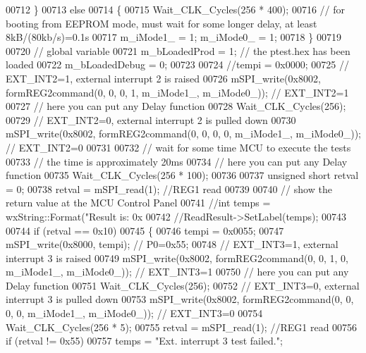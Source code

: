 \begin{DoxyCode}
{{{{00712     \}
00713     \textcolor{keywordflow}{else}
00714     \{
00715         Wait\_CLK\_Cycles(256 * 400);
00716         \textcolor{comment}{// for booting from EEPROM mode, must wait for some longer delay, at least 8kB/(80kb/s)=0.1s}
00717         m\_iMode1\_ = 1; m\_iMode0\_ = 1;
00718     \}
00719 
00720     \textcolor{comment}{// global variable}
00721     m\_bLoadedProd = 1;  \textcolor{comment}{// the ptest.hex has been loaded}
00722     m\_bLoadedDebug = 0;
00723 
00724     \textcolor{comment}{//tempi = 0x0000;}
00725     \textcolor{comment}{// EXT\_INT2=1, external interrupt 2 is raised}
00726     mSPI\_write(0x8002, formREG2command(0, 0, 0, 1, m\_iMode1\_, m\_iMode0\_)); \textcolor{comment}{// EXT\_INT2=1}
00727     \textcolor{comment}{// here you can put any Delay function}
00728     Wait\_CLK\_Cycles(256);
00729     \textcolor{comment}{// EXT\_INT2=0, external interrupt 2 is pulled down}
00730     mSPI\_write(0x8002, formREG2command(0, 0, 0, 0, m\_iMode1\_, m\_iMode0\_)); \textcolor{comment}{// EXT\_INT2=0}
00731 
00732     \textcolor{comment}{// wait for some time MCU to execute the tests}
00733     \textcolor{comment}{// the time is approximately 20ms}
00734     \textcolor{comment}{// here you can put any Delay function}
00735     Wait\_CLK\_Cycles(256 * 100);
00736 
00737     \textcolor{keywordtype}{unsigned} \textcolor{keywordtype}{short} retval = 0;
00738     retval = mSPI\_read(1); \textcolor{comment}{//REG1 read}
00739 
00740     \textcolor{comment}{// show the return value at the MCU Control Panel}
00741     \textcolor{comment}{//int temps = wxString::Format("Result is: 0x%
00742     \textcolor{comment}{//ReadResult->SetLabel(temps);}
00743 
00744     \textcolor{keywordflow}{if} (retval == 0x10)
00745     \{
00746         tempi = 0x0055;
00747         mSPI\_write(0x8000, tempi); \textcolor{comment}{// P0=0x55;}
00748         \textcolor{comment}{// EXT\_INT3=1, external interrupt 3 is raised}
00749         mSPI\_write(0x8002, formREG2command(0, 0, 1, 0, m\_iMode1\_, m\_iMode0\_)); \textcolor{comment}{// EXT\_INT3=1}
00750         \textcolor{comment}{// here you can put any Delay function}
00751         Wait\_CLK\_Cycles(256);
00752         \textcolor{comment}{// EXT\_INT3=0, external interrupt 3 is pulled down}
00753         mSPI\_write(0x8002, formREG2command(0, 0, 0, 0, m\_iMode1\_, m\_iMode0\_)); \textcolor{comment}{// EXT\_INT3=0}
00754         Wait\_CLK\_Cycles(256 * 5);
00755         retval = mSPI\_read(1);  \textcolor{comment}{//REG1 read}
00756         \textcolor{keywordflow}{if} (retval != 0x55)
00757             temps = \textcolor{stringliteral}{"Ext. interrupt 3 test failed."};
}}}}}
\end{DoxyCode}
